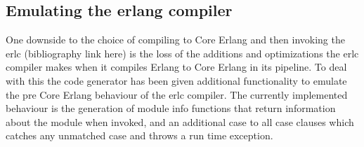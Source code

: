\subsection{Emulating the erlang compiler}


One downside to the choice of compiling to Core Erlang and then invoking the erlc
(bibliography link here) is the loss of the additions and optimizations the erlc
compiler makes when it compiles Erlang to Core Erlang in its pipeline. To deal with this
the code generator has been given additional functionality to emulate the pre Core Erlang
behaviour of the erlc compiler. The currently implemented behaviour is the generation of module info functions that return information about the module when invoked, and an additional case to all case clauses which catches any unmatched case and throws a run time exception.